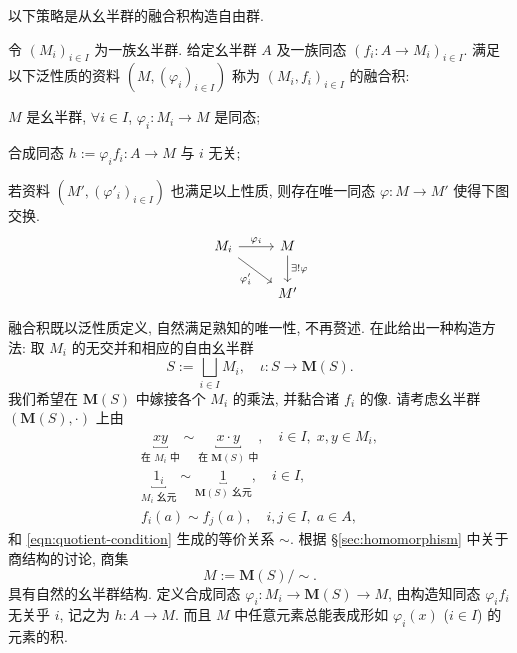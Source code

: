 以下策略是从幺半群的融合积构造自由群.
\begin{definition}[融合积]\label{def:amalgamated-product}
	令 $(M_i)_{i \in I}$ 为一族幺半群. 给定幺半群 $A$ 及一族同态 $(f_i: A \to M_i )_{i \in I}$. 满足以下泛性质的资料 $(M, (\varphi_i)_{i \in I})$ 称为 $(M_i, f_i)_{i \in I}$ 的融合积:
	\begin{compactitem}
		\item $M$ 是幺半群, $\forall i \in I$, $\varphi_i: M_i \to M$ 是同态;
		\item 合成同态 $h := \varphi_i f_i: A \to M$ 与 $i$ 无关;
		\item 若资料 $(M', (\varphi'_i)_{i \in I})$ 也满足以上性质, 则存在唯一同态 $\varphi: M \to M'$ 使得下图交换.
		\[ \begin{tikzcd}
			M_i \arrow[r, "{\varphi_i}"] \arrow[rd, "{\varphi'_i}"'] & M \arrow[d, "{\exists! \varphi}"] \\
			& M'
		\end{tikzcd} \]
	\end{compactitem}
\end{definition}

融合积既以泛性质定义, 自然满足熟知的唯一性, 不再赘述. 在此给出一种构造方法: 取 $M_i$ 的无交并和相应的自由幺半群
\[ S :=  \bigsqcup_{i \in I} M_i, \quad \iota: S \to \mathbf{M}(S). \]
我们希望在 $\mathbf{M}(S)$ 中嫁接各个 $M_i$ 的乘法, 并黏合诸 $f_i$ 的像. 请考虑幺半群 $(\mathbf{M}(S), \cdot)$ 上由
\begin{gather*}
	\underbracket{xy}_{\text{在 $M_i$ 中}} \sim \underbracket{x \cdot y}_{\text{在 $\mathbf{M}(S)$ 中}}, \quad i \in I, \; x,y \in M_i, \\
	\underbracket{1_i}_{\text{$M_i$ 幺元}} \sim \underbracket{1}_{\text{$\mathbf{M}(S)$ 幺元}}, \quad i \in I, \\
	f_i(a) \sim f_j(a), \quad i,j \in I, \; a \in A,
\end{gather*}
和 \eqref{eqn:quotient-condition} 生成的等价关系 $\sim$. 根据 \S\ref{sec:homomorphism} 中关于商结构的讨论, 商集
\[ M := \mathbf{M}(S)/\sim. \]
具有自然的幺半群结构. 定义合成同态 $\varphi_i: M_i \to \mathbf{M}(S) \to M$, 由构造知同态 $\varphi_i f_i$ 无关乎 $i$, 记之为 $h: A \to M$. 而且 $M$ 中任意元素总能表成形如 $\varphi_i(x)$ ($i \in I$) 的元素的积.


